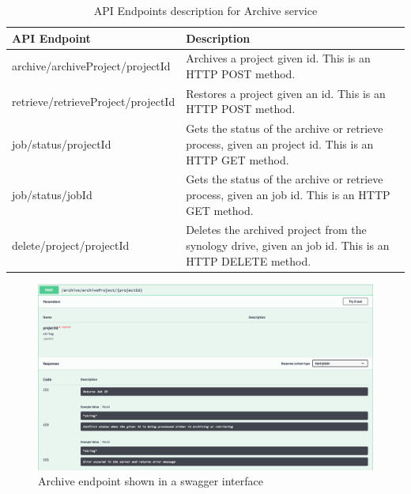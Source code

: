     \begin{table}[H]
        \centering
        \begin{tabular}{|p{6cm}|p{8cm}|}
            \hline
                \textbf{API Endpoint}&\textbf{Description}\\
            \hline
                archive/archiveProject/{{projectId}} & Archives a project given id. This is an HTTP POST method.\\
            \hline
                retrieve/retrieveProject/{{projectId}} & Restores a project given an id. This is an HTTP POST method.\\
            \hline
                job/status/{{projectId}} & Gets the status of the archive or retrieve process, given an project id. This is an HTTP GET method.\\
            \hline
                job/status/{{jobId}} & Gets the status of the archive or retrieve process, given an job id. This is an HTTP GET method.\\
            \hline
                delete/project/{{projectId}} & Deletes the archived project from the synology drive, given an job id. This is an HTTP DELETE method.\\
            \hline
        \end{tabular}
        \caption{API Endpoints description for Archive service}
        \label{table:archiveEndpoints}     
    \end{table}  
    \begin{figure}[H]
        \centering \includegraphics[scale=0.3]{grafiken/archiveSwagger.png}
        \caption{Archive endpoint shown in a swagger interface}
        \label{fig:archiveSwagger}
    \end{figure}

